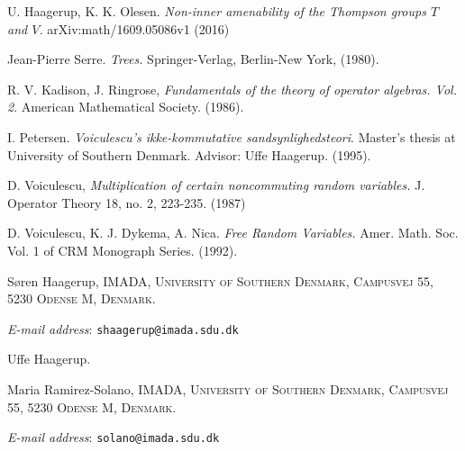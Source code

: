 \documentclass{amsart}
\makeatletter
\theoremstyle{definition}
\newcommand{\Addresses}{{%
  \bigskip
  \footnotesize
%
  S\o ren Haagerup, \textsc{IMADA, University of Southern Denmark, Campusvej 55, 5230 Odense M, Denmark.}\par\nopagebreak
  \textit{E-mail address}: \texttt{shaagerup@imada.sdu.dk}
  \medskip
  \medskip

  Uffe Haagerup. %

  \medskip
  \medskip

  Maria Ramirez-Solano, \textsc{IMADA, University of Southern Denmark, Campusvej 55, 5230 Odense M, Denmark.}\par\nopagebreak
  \textit{E-mail address}: \texttt{solano@imada.sdu.dk}
}}
\makeatother
\begin{document}
\begin{thebibliography}{99}
U. Haagerup, K. K. Olesen.
\emph{Non-inner amenability of the Thompson groups $T$ and $V$.}
arXiv:math/1609.05086v1
(2016)

 Jean-Pierre Serre. 
 \emph{Trees.}
 Springer-Verlag, Berlin-New York,
 (1980).



R. V. Kadison, J. Ringrose,
\emph{Fundamentals of the theory of operator algebras. Vol. 2}.
American Mathematical Society.
(1986).




I. Petersen.
\emph{Voiculescu's ikke-kommutative sandsynlighedsteori}.
Master's thesis at University of Southern Denmark. Advisor: Uffe Haagerup.
(1995).
 

D. Voiculescu,
\emph{Multiplication of certain noncommuting random variables.}
J. Operator Theory 18, no. 2, 223-235. 
(1987)


D. Voiculescu, K. J. Dykema, A. Nica.
\emph{Free Random Variables.}
Amer. Math. Soc. Vol. 1 of CRM Monograph Series.
(1992).


\end{thebibliography}

\Addresses
\end{document}
